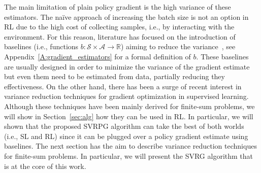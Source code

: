 \documentclass{article}
\makeatletter
\theoremstyle{remark}
\theoremstyle{definition}
\DeclareRobustCommand{\eg}{e.g.,\@\xspace}
\DeclareRobustCommand{\ie}{i.e.,\@\xspace}
\newcommand{\realspace}{\mathbb R}      %
\makeatother
\begin{document}
The main limitation of plain policy gradient is the high variance of these estimators.
The na\"ive approach of increasing the batch size is not an option in RL due to the high cost of collecting samples, \ie by interacting with the environment.
For this reason, literature has focused on the introduction of baselines (\ie functions $b : \mathcal{S} \times \mathcal{A} \to \realspace$) aiming to reduce the variance~\citep[\eg][]{williams1992simple,Peters2008reinf,Thomas2017actionbaseline,wu2018variance}, see Appendix~\ref{A:gradient_estimators} for a formal definition of $b$.
{\color{red}
These baselines are usually designed in order to minimize the variance of the gradient estimate but even them need to be estimated from data, partially reducing they effectiveness.
On the other hand, there has been a surge of recent interest in variance reduction techniques for gradient optimization in supervised learning.
Although these techniques have been mainly derived for finite-sum problems, we will show in Section~\ref{sec:alg} how they can be used in RL.
In particular, we will shown that the proposed SVRPG algorithm can take the best of both worlds (\ie SL and RL) since it can be plugged over a policy gradient estimate using baselines.
The next section has the aim to describe variance reduction techniques for finite-sum problems. In particular, we will present the SVRG algorithm that is at the core of this work.
}
\end{document}
